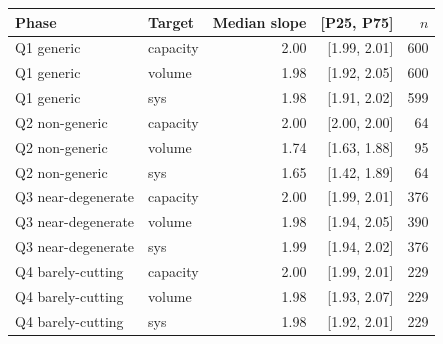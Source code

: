\begin{tabular}{l l r r r}
\toprule
Phase & Target & Median slope & [P25, P75] & $n$ \\
\midrule
Q1 generic & capacity & 2.00 & [1.99, 2.01] & 600 \\
Q1 generic & volume & 1.98 & [1.92, 2.05] & 600 \\
Q1 generic & sys & 1.98 & [1.91, 2.02] & 599 \\
\midrule
Q2 non-generic & capacity & 2.00 & [2.00, 2.00] & 64 \\
Q2 non-generic & volume & 1.74 & [1.63, 1.88] & 95 \\
Q2 non-generic & sys & 1.65 & [1.42, 1.89] & 64 \\
\midrule
Q3 near-degenerate & capacity & 2.00 & [1.99, 2.01] & 376 \\
Q3 near-degenerate & volume & 1.98 & [1.94, 2.05] & 390 \\
Q3 near-degenerate & sys & 1.99 & [1.94, 2.02] & 376 \\
\midrule
Q4 barely-cutting & capacity & 2.00 & [1.99, 2.01] & 229 \\
Q4 barely-cutting & volume & 1.98 & [1.93, 2.07] & 229 \\
Q4 barely-cutting & sys & 1.98 & [1.92, 2.01] & 229 \\
\bottomrule
\end{tabular}
